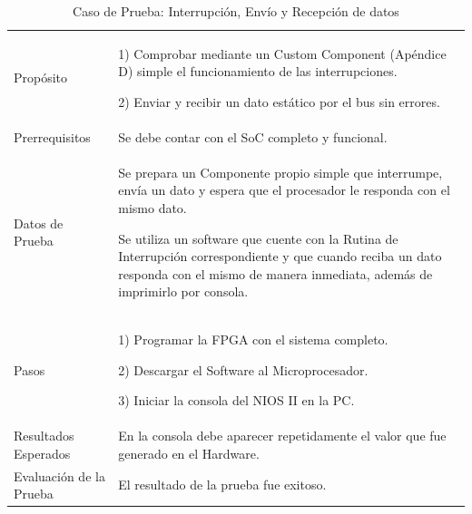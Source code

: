 \begin{table}
	\begin{tabular}{|>{\columncolor[gray]{0.8}}l|p{11cm}|} \hline
\multicolumn{2}{|>{\columncolor[gray]{0.8}}l|}{\textbf{Caso de Prueba: Interrupción, Envío y Recepción de datos}}\\ \hline
Propósito  & 1) Comprobar mediante un Custom Component (Apéndice D)  simple el funcionamiento de las interrupciones.

2) Enviar y recibir un dato estático por el bus sin errores. 
\\ \hline
 Prerrequisitos  & Se debe contar con el SoC completo y funcional.\\ \hline
 Datos de Prueba & Se prepara un Componente propio simple que interrumpe, envía un dato y espera que el procesador le responda con el mismo dato. 

Se utiliza un software que cuente con la Rutina de Interrupción correspondiente y que cuando reciba un dato responda con el mismo de manera inmediata, además de imprimirlo por consola.
 \\ \hline
 Pasos & 1) Programar la FPGA con el sistema completo.

2) Descargar el Software al Microprocesador.

3) Iniciar la consola del NIOS II en la PC.
\\ \hline
 Resultados Esperados & En la consola debe aparecer repetidamente el valor que fue generado en el Hardware. \\ \hline
 Evaluación de la Prueba  & El resultado de la prueba fue exitoso.\\ \hline
	\end{tabular}
	\caption{Caso de Prueba: Interrupción, Envío y Recepción de datos}
	\label{tab:enviorecepcion}
\end{table}
